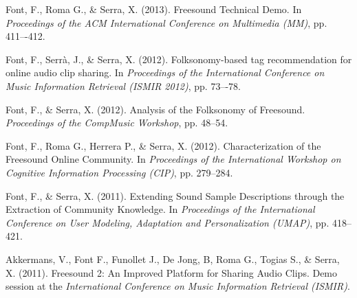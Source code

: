 \vspace{0.2cm}

Font, F., Roma G., \& Serra, X. (2013).  Freesound Technical Demo. In \emph{Proceedings of the ACM International Conference on Multimedia (MM)}, pp. 411–-412.

\vspace{0.2cm}

Font, F., Serr\`a, J., \& Serra, X. (2012). Folksonomy-based tag recommendation for online audio clip sharing. In \emph{Proceedings of the International Conference on Music Information Retrieval (ISMIR 2012)}, pp. 73–-78.

\vspace{0.2cm}

Font, F., \& Serra, X. (2012).  Analysis of the Folksonomy of Freesound. \emph{Proceedings of the CompMusic Workshop}, pp. 48--54.

\vspace{0.2cm}

Font, F., Roma G., Herrera P., \& Serra, X. (2012).  Characterization of the Freesound Online Community. In \emph{Proceedings of the International Workshop on Cognitive Information Processing (CIP)}, pp. 279--284.

\vspace{0.2cm}

Font, F., \& Serra, X. (2011).  Extending Sound Sample Descriptions through the Extraction of Community Knowledge. In \emph{Proceedings of the International Conference on User Modeling, Adaptation and Personalization (UMAP)}, pp. 418--421.

\vspace{0.2cm}

Akkermans, V., Font F., Funollet J., De Jong, B, Roma G., Togias S., \& Serra, X. (2011).  Freesound 2: An Improved Platform for Sharing Audio Clips. Demo session at the \emph{International Conference on Music Information Retrieval (ISMIR)}.